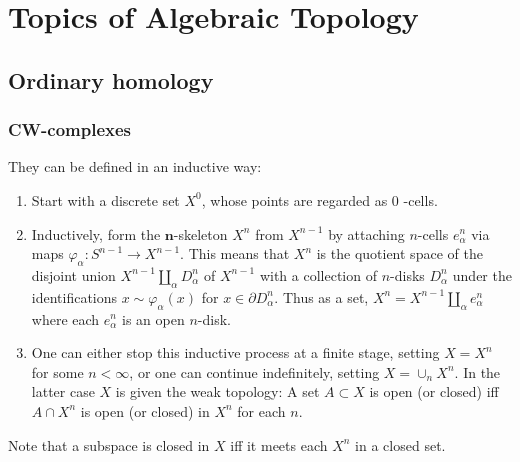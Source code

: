 \part{Topics of Algebraic Topology}




\chapter{Ordinary homology}



\section{CW-complexes}

They can be defined in an inductive way:

\begin{enumerate}
    \item Start with a discrete set $X^0$, whose points are regarded as 0 -cells.
    \item Inductively, form the $\boldsymbol{n}$-skeleton $X^n$ from $X^{n-1}$ by attaching $n$-cells $e_\alpha^n$ via maps $\varphi_\alpha: S^{n-1} \rightarrow X^{n-1}$. This means that $X^n$ is the quotient space of the disjoint union $X^{n-1} \amalg_\alpha D_\alpha^n$ of $X^{n-1}$ with a collection of $n$-disks $D_\alpha^n$ under the identifications $x \sim \varphi_\alpha(x)$ for $x \in \partial D_\alpha^n$. Thus as a set, $X^n=X^{n-1} \amalg_\alpha e_\alpha^n$ where each $e_\alpha^n$ is an open $n$-disk.
    \item One can either stop this inductive process at a finite stage, setting $X=X^n$ for some $n<\infty$, or one can continue indefinitely, setting $X=\cup_n X^n$. In the latter case $X$ is given the weak topology: A set $A \subset X$ is open (or closed) iff $A \cap X^n$ is open (or closed) in $X^n$ for each $n$.
    
\end{enumerate}

Note that a subspace is closed in $X$ iff it meets each $X^n$ in a closed set.


